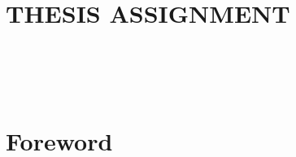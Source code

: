 
\setcounter{page}{\abstractPageNumber} %
\fontsize{12}{0} %

\chapter*{{\authorDeclarationTitle}}\label{chapter:declaration} %
\pagebreak %

\chapter*{THESIS ASSIGNMENT}\label{chapter:assignment}

\pagebreak

\chapter*{{\abstactTitle}}\label{chapter:abstract}
    {}
    {}
\pagebreak

\chapter*{
    {\secondAbstractTitle}\\[24pt] %
    {\large\abstractThesisTitle}
}\label{chapter:abstract-english}
    {}
    {}
\pagebreak

\chapter*{Foreword}\label{chapter:foreword}

\pagebreak

